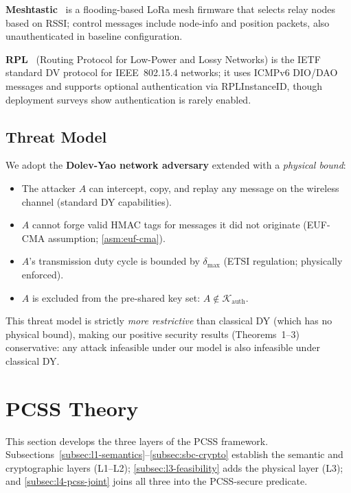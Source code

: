 \documentclass[journal,compsoc]{IEEEtran}
\theoremstyle{plain}
\theoremstyle{definition}
\theoremstyle{remark}
\begin{document}
\textbf{Meshtastic}~\cite{meshtasticdocs} is a flooding-based LoRa mesh
firmware that selects relay nodes based on RSSI; control messages include
node-info and position packets, also unauthenticated in baseline
configuration.

\textbf{RPL}~\cite{rfc6550} (Routing Protocol for Low-Power and Lossy
Networks) is the IETF standard DV protocol for IEEE~802.15.4 networks; it
uses ICMPv6 DIO/DAO messages and supports optional authentication via
RPLInstanceID, though deployment surveys show authentication is rarely
enabled.

\subsection{Threat Model}

We adopt the \textbf{Dolev-Yao network adversary} extended with a
\emph{physical bound}:
\begin{itemize}[nosep]
  \item The attacker $A$ can intercept, copy, and replay any message
        on the wireless channel (standard DY capabilities).
  \item $A$ cannot forge valid HMAC tags for messages it did not
        originate (EUF-CMA assumption; \cref{asm:euf-cma}).
  \item $A$'s transmission duty cycle is bounded by $\delta_{\max}$
        (ETSI regulation; physically enforced).
  \item $A$ is excluded from the pre-shared key set:
        $A \notin \mathcal{K}_{\mathrm{auth}}$.
\end{itemize}

This threat model is strictly \emph{more restrictive} than classical DY
(which has no physical bound), making our positive security results
(Theorems~1--3) conservative: any attack infeasible under our model is
also infeasible under classical DY.

\section{PCSS Theory}
\label{sec:theory}

This section develops the three layers of the PCSS framework.
Subsections~\ref{subsec:l1-semantics}--\ref{subsec:sbc-crypto} establish
the semantic and cryptographic layers (L1--L2); \cref{subsec:l3-feasibility}
adds the physical layer (L3); and \cref{subsec:l4-pcss-joint} joins all
three into the PCSS-secure predicate.
\end{document}
